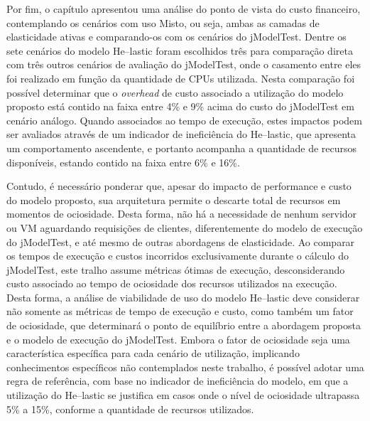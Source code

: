 \documentclass[english,brazilian]{UNISINOSmonografia} %
\begin{document}
Por fim, o capítulo apresentou uma análise do ponto de vista do custo financeiro, contemplando os cenários com uso Misto, ou seja, ambas as camadas de elasticidade ativas e comparando-os com os cenários do jModelTest.
%
Dentre os sete cenários do modelo \textsf{He}--lastic foram escolhidos três para comparação direta com três outros cenários de avaliação do jModelTest, onde o casamento entre eles foi realizado em função da quantidade de CPUs utilizada.
%
Nesta comparação foi possível determinar que o \textit{overhead} de custo associado a utilização do modelo proposto está contido na faixa entre 4\% e 9\% acima do custo do jModelTest em cenário análogo.
%
Quando associados ao tempo de execução, estes impactos podem ser avaliados através de um indicador de ineficiência do \textsf{He}--lastic, que apresenta um comportamento ascendente, e portanto acompanha a quantidade de recursos disponíveis, estando contido na faixa entre 6\% e 16\%.



Contudo, é necessário ponderar que, apesar do impacto de performance e custo do modelo proposto, sua arquitetura permite o descarte total de recursos em momentos de ociosidade.
%
Desta forma, não há a necessidade de nenhum servidor ou VM aguardando requisições de clientes, diferentemente do modelo de execução do jModelTest, e até mesmo de outras abordagens de elasticidade.
%
Ao comparar os tempos de execução e custos incorridos exclusivamente durante o cálculo do jModelTest, este tralho assume métricas ótimas de execução, desconsiderando custo associado ao tempo de ociosidade dos recursos utilizados na execução.
%
Desta forma, a análise de viabilidade de uso do modelo \textsf{He}--lastic deve considerar não somente as métricas de tempo de execução e custo, como também um fator de ociosidade, que determinará o ponto de equilíbrio entre a abordagem proposta e o modelo de execução do jModelTest.
%
Embora o fator de ociosidade seja uma característica específica para cada cenário de utilização, implicando conhecimentos específicos não contemplados neste trabalho, é possível adotar uma regra de referência, com base no indicador de ineficiência do modelo, em que a utilização do \textsf{He}--lastic se justifica em casos onde o nível de ociosidade ultrapassa 5\% a 15\%, conforme a quantidade de recursos utilizados.
\end{document}
